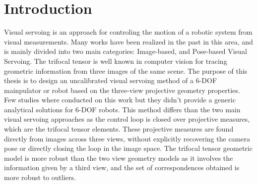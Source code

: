 \section{Introduction}
Visual servoing is an approach for controling the motion of a robotic system from visual measurements. Many works have been realized in the past in this area, and is mainly divided into two main categories: Image-based, and Pose-based Visual Servoing. The trifocal tensor is well known in computer vision for tracing geometric information from three images of the same scene. The purpose of this thesis is to design an uncalibrated visual servoing method of a 6-DOF mainpulator or robot based on the three-view projective geometry properties. Few studies where conducted on this work but they didn't provide a generic analytical solutions for 6-DOF robots. This method differs than the two main visual servoing approaches as the control loop is closed over projective measures, which are the trifocal tensor elements. These projective measures are found directly from images across three views, without explicitly recovering the camera pose or directly closing the loop in the image space. The trifocal tensor geometric model is more robust than the two view geometry models as it involves the information given by a third view, and the set of correspondences obtained is more robust to outliers.
